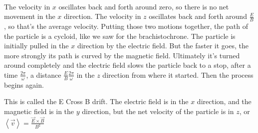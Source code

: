 \documentclass[12pt]{article}
\begin{document}
{\begin{align*}
\end{align*}
The velocity in $x$ oscillates back and forth around zero, so there is no net movement in the $x$ direction. The velocity in $z$ oscillates back and forth around $\tfrac{E}{B}$, so that's the average velocity. Putting those two motions together, the path of the particle is a cycloid, like we saw for the brachistochrone. The particle is initially pulled in the $x$ direction by the electric field. But the faster it goes, the more strongly its path is curved by the magnetic field. Ultimately it's turned around completely and the electric field slows the particle back to a stop, after a time $\tfrac{2\pi}{\omega}$, a distance $\tfrac{E}{B} \frac{2\pi}{\omega}$ in the $z$ direction from where it started. Then the process begins again. 

This is called the E Cross B drift. The electric field is in the $x$ direction, and the magnetic field is in the $y$ direction, but the net velocity of the particle is in $z$, or $\left< \vec{v} \right> = \frac{\vec{E} \times \vec{B}}{B^2}$





}
\end{document}

